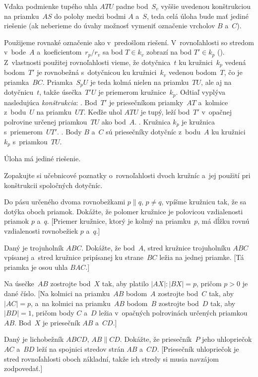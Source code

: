 {Vďaka podmienke tupého uhla $ATU$ padne bod~$S_v$ vyššie
uvedenou konštrukciou na priamku~$AS$ do polohy
medzi bodmi $A$ a~$S$, teda celá úloha bude mať jediné riešenie
(ak neberieme do úvahy možnosť vymeniť označenie vrcholov $B$ a~$C$).


\ineriesenie
Použijeme rovnaké označenie ako v~predošlom riešení.
V~rovnoľahlosti so stredom v~bode~$A$ a~koeficientom~$r_p/r_v$ sa bod $T \in k_v$
%
zobrazí na bod $T'\in k_p$ (\obr). Z~vlastnosti použitej
rovnoľahlosti vieme, že dotyčnica~$t$ ku kružnici~$k_p$ vedená bodom~$T'$
je rovnobežná s~dotyčnicou ku kružnici~$k_v$ vedenou bodom~$T$, čo je priamka~$BC$. Priamka~$S_pU$ je teda kolmá
nielen na priamku~$TU$, ale aj na dotyčnicu~$t$, takže úsečka~$T'U$ je
priemerom kružnice~$k_p$. Odtiaľ vyplýva nasledujúca
{\it konštrukcia}:
.
Bod~$T'$ je priesečníkom priamky~$AT$ a~kolmice z~bodu~$U$ na
priamku~$UT$. Keďže uhol $ATU$ je tupý, leží bod~$T'$ v~opačnej
polrovine určenej priamkou~$TU$ ako bod~$A$.
.
Kružnica $k_p$ je kružnica s~priemerom~$UT'$.
.
Body $B$ a~$C$ sú priesečníky dotyčníc z~bodu~$A$ ku kružnici~$k_p$ s~priamkou~$TU$.

Úloha má jediné riešenie.


\titem
Zopakujte si učebnicové poznatky
o~rovnoľahlosti dvoch kružníc a~jej použití pri konštrukcii spoločných
dotyčníc.

Do pásu určeného dvoma rovnobežkami $p \parallel q$, $p \ne q$, vpíšme
kružnicu tak, že sa dotýka oboch priamok. Dokážte, že polomer
kružnice je polovicou vzdialenosti priamok $p$ a~$q$. [Priemer kružnice,
ktorý je kolmý na priamku~$p$, má dĺžku rovnú vzdialenosti rovnobežiek $p$ a~$q$.]

Daný je trojuholník $ABC$. Dokážte, že bod~$A$, stred
kružnice trojuholníku $ABC$ vpísanej a~stred kružnice pripísanej ku strane~$BC$
ležia na jednej priamke. [Tá priamka je osou uhla $BAC$.]

Na úsečke~$AB$ zostrojte bod~$X$ tak, aby platilo $|AX|:|BX|= p$, pričom $p>0$
je dané číslo.
[Na kolmici na priamku~$AB$ bodom~$A$ zostrojte bod~$C$ tak, aby $|AC|= p$,
a~na kolmici na priamku~$AB$ bodom~$B$ zostrojte bod~$D$ tak, aby
$|BD|= 1$, pričom body $C$ a~$D$ ležia v~opačných polrovinách určených
priamkou~$AB$. Bod~$X$ je priesečník $AB$ a~$CD$.]

\D
Daný je lichobežník $ABCD$, $AB \parallel CD$. Dokážte, že priesečník~$P$
jeho uhlopriečok $AC$ a~$BD$ leží na spojnici stredov strán $AB$ a~$CD$.
[Priesečník uhlopriečok je stred rovnoľahlosti oboch základní, takže ich
stredy si musia navzájom zodpovedať.]

}
